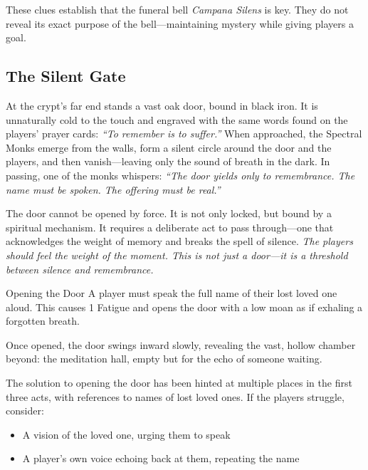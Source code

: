 These clues establish that the funeral bell \emph{Campana Silens} is key. They do not reveal its exact purpose of the bell—maintaining mystery while giving players a goal.

\subsection{The Silent Gate}

At the crypt’s far end stands a vast oak door, bound in black iron. It is unnaturally cold to the touch and engraved with the same words found on the players’ prayer cards: \emph{“To remember is to suffer.”} When approached, the Spectral Monks emerge from the walls, form a silent circle around the door and the players, and then vanish—leaving only the sound of breath in the dark. In passing, one of the monks whispers: \emph{“The door yields only to remembrance. The name must be spoken. The offering must be real.”}

The door cannot be opened by force. It is not only locked, but bound by a spiritual mechanism. It requires a deliberate act to pass through—one that acknowledges the weight of memory and breaks the spell of silence. \emph{The players should feel the weight of the moment. This is not just a door—it is a threshold between silence and remembrance.}

\begin{Example}{Opening the Door}
    A player must speak the full name of their lost loved one aloud. This causes 1 Fatigue and opens the door with a low moan as if exhaling a forgotten breath.
\end{Example}

Once opened, the door swings inward slowly, revealing the vast, hollow chamber beyond: the meditation hall, empty but for the echo of someone waiting.

\begin{GmTips}
    The solution to opening the door has been hinted at multiple places in the first three acts, with references to names of lost loved ones. If the players struggle, consider:
    \begin{itemize}
        \item A vision of the loved one, urging them to speak
        \item A player’s own voice echoing back at them, repeating the name
    \end{itemize}
\end{GmTips}


